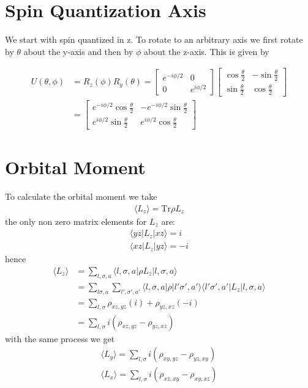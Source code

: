 \documentclass[11pt]{article}
\begin{document}
\section{Spin Quantization Axis}
We start with spin quantized in z. To rotate to an arbitrary axis we first rotate by $\theta$ about the y-axis 
and then by $\phi$ about the z-axis. This is given by

\begin{align}
    U(\theta, \phi) &= R_z(\phi) R_y(\theta) = 
    \begin{bmatrix}
        e^{-i\phi/2} & 0 \\
        0 & e^{i\phi/2}
    \end{bmatrix}
    \begin{bmatrix}
        \cos{\frac{\theta}{2}} & -\sin{\frac{\theta}{2}} \\
        \sin{\frac{\theta}{2}} & \cos{\frac{\theta}{2}}
    \end{bmatrix}
    \\\nonumber
    &= \begin{bmatrix}
        e^{-i\phi/2}\cos{\frac{\theta}{2}} & -e^{-i\phi/2}\sin{\frac{\theta}{2}} \\
        e^{i\phi/2}\sin{\frac{\theta}{2}} & e^{i\phi/2}\cos{\frac{\theta}{2}}
    \end{bmatrix}
\end{align}
\section{Orbital Moment}
To calculate the orbital moment we take
\begin{gather}
    \langle L_z \rangle = \text{Tr} \rho L_z
\end{gather}
the only non zero matrix elements for $L_z$ are:
\begin{gather}
    \langle yz | L_z | xz \rangle = i \\
    \langle xz | L_z | yz \rangle = -i
\end{gather}
hence
\begin{align}
    \langle L_z \rangle &= \sum_{l, \sigma, a} \langle l, \sigma, a | \rho L_z | l, \sigma, a \rangle \\\nonumber
    &= \sum_{l \sigma, a} \sum_{l', \sigma', a'} \langle l, \sigma, a | \rho |l' \sigma', a' \rangle \langle l' \sigma', a' | L_z | l, \sigma, a \rangle \\\nonumber
    &= \sum_{l,\sigma} \rho_{xz, yz}(i) + \rho_{yz, xz}(-i) \\\nonumber
    &= \sum_{l,\sigma} i(\rho_{xz, yz}-\rho_{yz, xz})
\end{align}
with the same process we get
\begin{gather}
    \langle L_y \rangle = \sum_{l,\sigma} i(\rho_{xy, yz} - \rho_{yz, xy}) \\
    \langle L_x \rangle = \sum_{l,\sigma} i(\rho_{xz, xy} - \rho_{xy, xz})
\end{gather}
\end{document}

